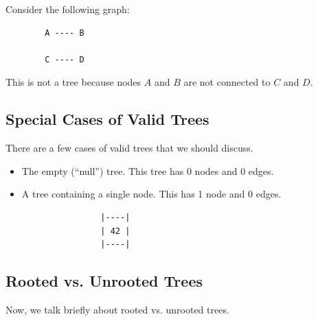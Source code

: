 \documentclass[letterpaper]{article}
\begin{document}
\begin{itemize}
    \bigskip 

    Consider the following graph:
    \begin{verbatim}
        A ---- B

        C ---- D
    \end{verbatim}
    This is not a tree because nodes $A$ and $B$ are not connected to $C$ and $D$. 
\end{itemize}

\subsection{Special Cases of Valid Trees}
There are a few cases of valid trees that we should discuss. 

\begin{itemize}
    \item The empty (``null'') tree. This tree has 0 nodes and 0 edges. 

    \item A tree containing a single node. This has 1 node and 0 edges. 
    \begin{verbatim}
                |----|
                | 42 |
                |----|
    \end{verbatim}
\end{itemize}

\subsection{Rooted vs. Unrooted Trees}
Now, we talk briefly about rooted vs. unrooted trees. 
\end{document}
